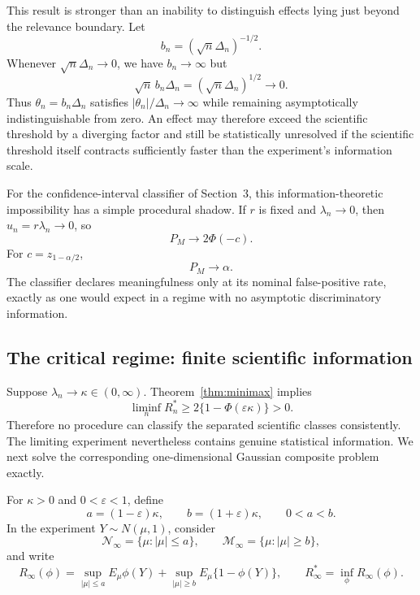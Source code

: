 \documentclass[11pt]{article}
\theoremstyle{remark}
\begin{document}
This result is stronger than an inability to distinguish effects lying just beyond the relevance boundary. Let
\[
b_n=(\sqrt n\Delta_n)^{-1/2}.
\]
Whenever $\sqrt n\Delta_n\to0$, we have $b_n\to\infty$ but
\[
\sqrt n\,b_n\Delta_n=(\sqrt n\Delta_n)^{1/2}\to0.
\]
Thus $\theta_n=b_n\Delta_n$ satisfies $|\theta_n|/\Delta_n\to\infty$ while remaining asymptotically indistinguishable from zero. An effect may therefore exceed the scientific threshold by a diverging factor and still be statistically unresolved if the scientific threshold itself contracts sufficiently faster than the experiment's information scale.

For the confidence-interval classifier of Section~3, this information-theoretic impossibility has a simple procedural shadow. If $r$ is fixed and $\lambda_n\to0$, then $u_n=r\lambda_n\to0$, so
\[
P_M\to2\Phi(-c).
\]
For $c=z_{1-\alpha/2}$,
\begin{equation}
P_M\to\alpha.
\label{eq:alpha-shadow}
\end{equation}
The classifier declares meaningfulness only at its nominal false-positive rate, exactly as one would expect in a regime with no asymptotic discriminatory information.

\subsection{The critical regime: finite scientific information}

Suppose $\lambda_n\to\kappa\in(0,\infty)$. Theorem~\ref{thm:minimax} implies
\[
\liminf_nR_n^*\ge2\{1-\Phi(\varepsilon\kappa)\}>0.
\]
Therefore no procedure can classify the separated scientific classes consistently. The limiting experiment nevertheless contains genuine statistical information. We next solve the corresponding one-dimensional Gaussian composite problem exactly.

For $\kappa>0$ and $0<\varepsilon<1$, define
\[
a=(1-\varepsilon)\kappa,
\qquad
b=(1+\varepsilon)\kappa,
\qquad 0<a<b.
\]
In the experiment $Y\sim N(\mu,1)$, consider
\[
\mathcal N_\infty=\{\mu:|\mu|\le a\},
\qquad
\mathcal M_\infty=\{\mu:|\mu|\ge b\},
\]
and write
\[
R_\infty(\phi)
=
\sup_{|\mu|\le a}E_\mu\phi(Y)
+
\sup_{|\mu|\ge b}E_\mu\{1-\phi(Y)\},
\qquad
R_\infty^*=\inf_\phi R_\infty(\phi).
\]
\end{document}
